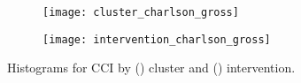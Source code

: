 \begin{figure}
    \centering
    \begin{subfigure}{\halfimgwidth}
        \texttt{[image: cluster\_charlson\_gross]}
        \caption{}\label{fig:cluster_charlson}
    \end{subfigure}\hfill%
    \begin{subfigure}{\halfimgwidth}
        \texttt{[image: intervention\_charlson\_gross]}
        \caption{}\label{fig:intervention_charlson}
    \end{subfigure}
    \caption{%
        Histograms for CCI by () cluster and
        () intervention.
    }\label{fig:charlson_hist}
\end{figure}



